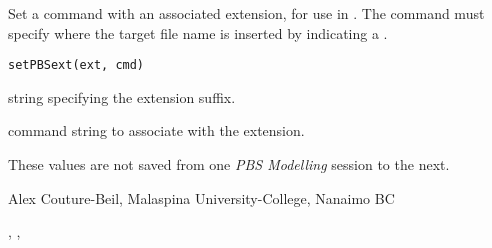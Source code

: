 \documentclass[letterpaper]{book}
\begin{document}
\begin{Description}\relax
Set a command with an associated extension, for use in 
.  The command must specify where the target file 
name is inserted by indicating a .
\end{Description}
\begin{Usage}
\begin{verbatim}
setPBSext(ext, cmd)
\end{verbatim}
\end{Usage}
\begin{Arguments}
\begin{ldescription}
\item[\code{ext}] string specifying the extension suffix.
\item[\code{cmd}] command string to associate with the extension.
\end{ldescription}
\end{Arguments}
\begin{Note}\relax
These values are not saved from one \emph{PBS Modelling} session to the next.
\end{Note}
\begin{Author}\relax
Alex Couture-Beil, Malaspina University-College, Nanaimo BC
\end{Author}
\begin{SeeAlso}\relax
{}, , 
\end{SeeAlso}
\end{document}
